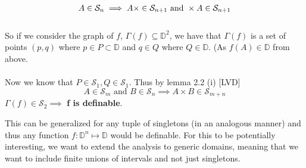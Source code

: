 \begin{exmp}
    \begin{equation*}
        A \in \mathcal{S}_n\implies A \times\real\in\mathcal{S}_{n+1} \text{ and } \real \times A\in\mathcal{S}_{n+1}
    \end{equation*}
    \\
    So if we consider the graph of $f$, $\Gamma(f)\subseteq\mathbb{D}^2$, we have that $\Gamma(f)$ is a set of points $(p,q)$ where $p\in P\subset\mathbb{D}$ and $q\in Q$ where $Q\in\mathbb{D}$. (As $f(A)\in\mathbb{D}$ from above.
    \\\\
    Now we know that $P\in\mathcal{S}_1, Q\in\mathcal{S}_1$. Thus by lemma 2.2 (i) [LVD]
    \begin{equation*}
        A\in\mathcal{S}_m \text{ and } B\in\mathcal{S}_n \implies A\times B\in\mathcal{S}_{m+n}
    \end{equation*}
    $\Gamma(f)\in\mathcal{S}_2\implies$ \textbf{f is definable}.

    This can be generalized for any tuple of singletons (in an analogous manner) and thus any function $f:\mathbb{D}^n\mapsto\mathbb{D}$ would be definable. For this to be potentially interesting, we want to extend the analysis to generic domains, meaning that we want to include finite unions of intervals and not just singletons.
\end{exmp} 

